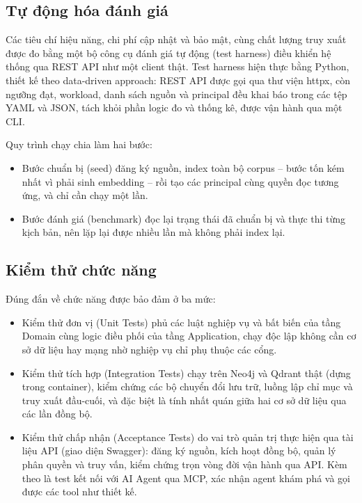 \subsection{Tự động hóa đánh giá}

Các tiêu chí hiệu năng, chi phí cập nhật và bảo mật, cùng chất lượng truy xuất được đo bằng một bộ công cụ đánh giá tự động (test harness) điều khiển hệ thống qua REST API như một client thật. Test harness hiện thực bằng Python, thiết kế theo data-driven approach: REST API được gọi qua thư viện httpx, còn ngưỡng đạt, workload, danh sách nguồn và principal đều khai báo trong các tệp YAML và JSON, tách khỏi phần logic đo và thống kê, được vận hành qua một CLI.

Quy trình chạy chia làm hai bước:
\begin{itemize}
  \item Bước chuẩn bị (seed) đăng ký nguồn, index toàn bộ corpus -- bước tốn kém nhất vì phải sinh embedding -- rồi tạo các principal cùng quyền đọc tương ứng, và chỉ cần chạy một lần. 
  \item Bước đánh giá (benchmark) đọc lại trạng thái đã chuẩn bị và thực thi từng kịch bản, nên lặp lại được nhiều lần mà không phải index lại.
\end{itemize}

\subsection{Kiểm thử chức năng}

Đúng đắn về chức năng được bảo đảm ở ba mức:

\begin{itemize}
  \item Kiểm thử đơn vị (Unit Tests) phủ các luật nghiệp vụ và bất biến của tầng Domain cùng logic điều phối của tầng Application, chạy độc lập không cần cơ sở dữ liệu hay mạng nhờ nghiệp vụ chỉ phụ thuộc các cổng.
  \item Kiểm thử tích hợp (Integration Tests) chạy trên Neo4j và Qdrant thật (dựng trong container), kiểm chứng các bộ chuyển đổi lưu trữ, luồng lập chỉ mục và truy xuất đầu-cuối, và đặc biệt là tính nhất quán giữa hai cơ sở dữ liệu qua các lần đồng bộ.
  \item Kiểm thử chấp nhận (Acceptance Tests) do vai trò quản trị thực hiện qua tài liệu API (giao diện Swagger): đăng ký nguồn, kích hoạt đồng bộ, quản lý phân quyền và truy vấn, kiểm chứng trọn vòng đời vận hành qua API. Kèm theo là test kết nối với AI Agent qua MCP, xác nhận agent khám phá và gọi được các tool như thiết kế.
\end{itemize}

